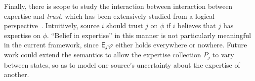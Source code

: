 Finally, there is scope to study the interaction between interaction between
expertise and \emph{trust}, which has been extensively studied from a logical
perspective~\cite{booth_trust_2018,Liau_2003,lorini2014trust,herzig2010logic}.
Intuitively, source $i$ should trust $j$ on $\phi$ if $i$ believes that $j$ has
expertise on $\phi$. ``Belief in expertise'' in this manner is not particularly
meaningful in the current framework, since $\mathsf{E}_j\varphi$ either holds everywhere
or nowhere. Future work could extend the semantics to allow the expertise
collection $P_j$ to vary between states, so as to model one source's
uncertainty about the expertise of another.
